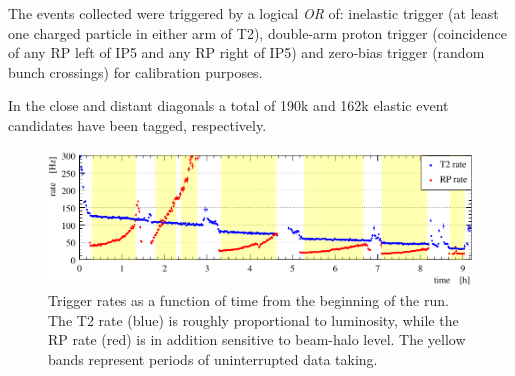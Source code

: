 The events collected were triggered by a logical \textit{OR} of: inelastic 
trigger (at least one charged particle in either arm of T2), double-arm proton trigger 
(coincidence of any RP left of IP5 and any RP right of IP5) and zero-bias trigger (random bunch crossings) for calibration purposes.

In the close and distant diagonals a total of 190k and 162k elastic event candidates have been tagged, respectively.


\begin{figure}
\begin{center}
\includegraphics{fig/trigger_rate.pdf}
\vskip-3mm
\caption{%
Trigger rates as a function of time from the beginning of the run. The T2 rate (blue) is roughly proportional to luminosity, while the RP rate (red) is in addition sensitive to beam-halo level. The yellow bands represent periods of uninterrupted data taking.
}
\label{fig:overview}
\end{center}
\end{figure}
